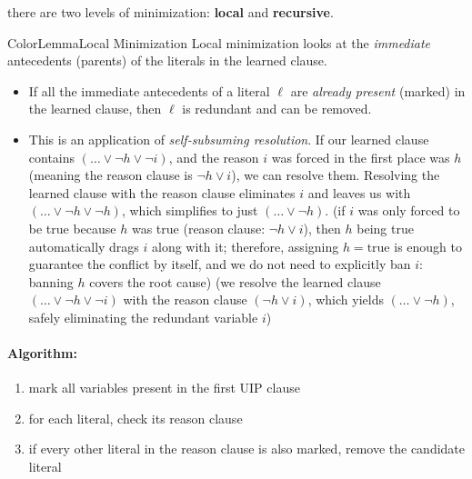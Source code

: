 \documentclass[a4paper, 11pt]{report}
\begin{document}
there are two levels of minimization: \textbf{local} and \textbf{recursive}.




\begin{cframe}{ColorLemma}{Local Minimization}
Local minimization looks at the \textit{immediate} antecedents (parents) of the literals in the learned clause.

\begin{itemize}
    \item If all the immediate antecedents of a literal $\ell$ are \textit{already present} (marked) in the learned clause, then $\ell$ is redundant and can be removed.
    \item This is an application of \textit{self-subsuming resolution}. If our learned clause contains $(\dots \lor \neg h \lor \neg i)$, and the reason $i$ was forced in the first place was $h$ (meaning the reason clause is $\neg h \lor i$), we can resolve them. Resolving the learned clause with the reason clause eliminates $i$ and leaves us with $(\dots \lor \neg h \lor \neg h)$, which simplifies to just $(\dots \lor \neg h)$.
\subitem (if $i$ was only forced to be true because $h$ was true (reason clause: $\neg h \lor i$), then $h$ being true automatically drags $i$ along with it; therefore, assigning $h = \text{true}$ is enough to guarantee the conflict by itself, and we do not need to explicitly ban $i$: banning $h$ covers the root cause)
\subitem (we resolve the learned clause $(\dots \lor \neg h \lor \neg i)$ with the reason clause $(\neg h \lor i)$, which yields $(\dots \lor \neg h)$, safely eliminating the redundant variable $i$)
        \vspace{-1em}
\end{itemize}
\paragraph{Algorithm:}

    \begin{enumerate}
\vspace{-1em}
        \item mark all variables present in the first UIP clause
        \item for each literal, check its reason clause
        \item if every other literal in the reason clause is also marked, remove the candidate literal
    \end{enumerate}
\end{cframe}
\end{document}
